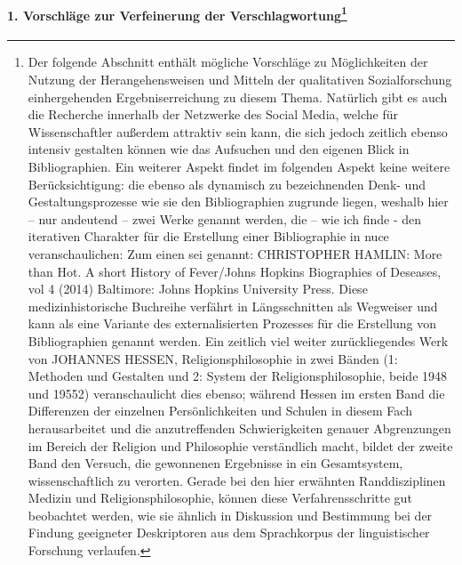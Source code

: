 \documentclass[a4paper,
fontsize=11pt,
oneside,
numbers=noperiodatend,
parskip=half-,
bibliography=totoc,
final
]{scrartcl}
\begin{document}
\paragraph[1. Vorschläge zur Verfeinerung der
Verschlagwortung]{\texorpdfstring{1. Vorschläge zur Verfeinerung der
Verschlagwortung\footnote{Der folgende Abschnitt enthält mögliche
  Vorschläge zu Möglichkeiten der Nutzung der Herangehensweisen und
  Mitteln der qualitativen Sozialforschung einhergehenden
  Ergebniserreichung zu diesem Thema. Natürlich gibt es auch die
  Recherche innerhalb der Netzwerke des Social Media, welche für
  Wissenschaftler außerdem attraktiv sein kann, die sich jedoch zeitlich
  ebenso intensiv gestalten können wie das Aufsuchen und den eigenen
  Blick in Bibliographien. Ein weiterer Aspekt findet im folgenden
  Aspekt keine weitere Berücksichtigung: die ebenso als dynamisch zu
  bezeichnenden Denk- und Gestaltungsprozesse wie sie den Bibliographien
  zugrunde liegen, weshalb hier -- nur andeutend -- zwei Werke genannt
  werden, die -- wie ich finde - den iterativen Charakter für die
  Erstellung einer Bibliographie in nuce veranschaulichen: Zum einen sei
  genannt: CHRISTOPHER HAMLIN: More than Hot. A short History of
  Fever/Johns Hopkins Biographies of Deseases, vol 4 (2014) Baltimore:
  Johns Hopkins University Press. Diese medizinhistorische Buchreihe
  verfährt in Längsschnitten als Wegweiser und kann als eine Variante
  des externalisierten Prozesses für die Erstellung von Bibliographien
  genannt werden. Ein zeitlich viel weiter zurückliegendes Werk von
  JOHANNES HESSEN, Religionsphilosophie in zwei Bänden (1: Methoden und
  Gestalten und 2: System der Religionsphilosophie, beide 1948 und
  19552) veranschaulicht dies ebenso; während Hessen im ersten Band die
  Differenzen der einzelnen Persönlichkeiten und Schulen in diesem Fach
  herausarbeitet und die anzutreffenden Schwierigkeiten genauer
  Abgrenzungen im Bereich der Religion und Philosophie verständlich
  macht, bildet der zweite Band den Versuch, die gewonnenen Ergebnisse
  in ein Gesamtsystem, wissenschaftlich zu verorten. Gerade bei den hier
  erwähnten Randdisziplinen Medizin und Religionsphilosophie, können
  diese Verfahrensschritte gut beobachtet werden, wie sie ähnlich in
  Diskussion und Bestimmung bei der Findung geeigneter Deskriptoren aus
  dem Sprachkorpus der linguistischer Forschung verlaufen.}}{1. Vorschläge zur Verfeinerung der Verschlagwortung}}\label{vorschluxe4ge-zur-verfeinerung-der-verschlagwortung16}
\end{document}
